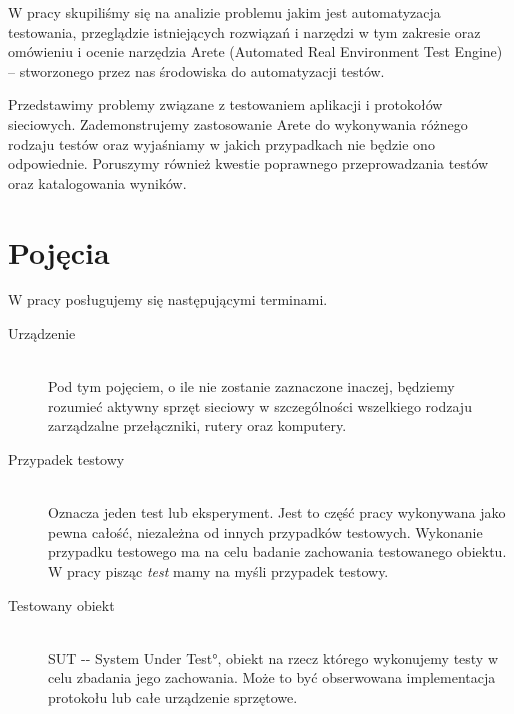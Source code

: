 \documentclass[00-praca-magisterska.tex]{subfiles}
\begin{document}
W pracy skupiliśmy się na analizie problemu jakim jest automatyzacja
testowania, przeglądzie istniejących rozwiązań i narzędzi w tym zakresie oraz
omówieniu i ocenie narzędzia Arete (Automated Real Environment Test Engine) --
stworzonego przez nas środowiska do automatyzacji testów.

Przedstawimy problemy związane z testowaniem aplikacji i protokołów sieciowych.
Zademonstrujemy zastosowanie Arete do wykonywania różnego rodzaju testów oraz
wyjaśniamy w jakich przypadkach nie będzie ono odpowiednie. Poruszymy również
kwestie poprawnego przeprowadzania testów oraz katalogowania wyników.

\section{Pojęcia}
\label{pojecia}

W pracy posługujemy się następującymi terminami. 

\begin{description}
  \item[Urządzenie] \hfill \\
Pod tym pojęciem, o ile nie zostanie zaznaczone inaczej, będziemy rozumieć
aktywny sprzęt sieciowy w szczególności wszelkiego rodzaju zarządzalne
przełączniki, rutery oraz komputery.
  \item[Przypadek testowy] \hfill \\
Oznacza jeden test lub eksperyment. Jest to część pracy wykonywana jako pewna
całość, niezależna od innych przypadków testowych. Wykonanie przypadku
testowego ma na celu badanie zachowania testowanego obiektu. W pracy pisząc
\emph{test} mamy na myśli przypadek testowy.
  \item[Testowany obiekt] \hfill \\
\ang{SUT -- System Under Test}, obiekt na rzecz którego wykonujemy testy w celu
zbadania jego zachowania. Może to być obserwowana implementacja protokołu lub
całe urządzenie sprzętowe.
\end{description}
\end{document}
